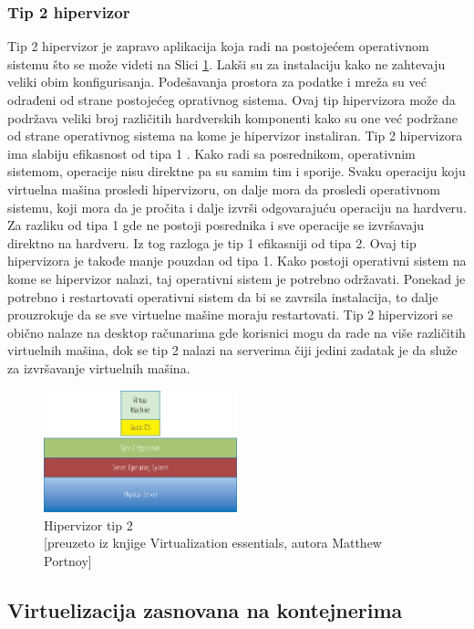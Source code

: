 \documentclass[12pt,oneside]{memoir}
\begin{document}
\subsubsection{Tip 2 hipervizor}
Tip 2 hipervizor je zapravo aplikacija koja radi na postojećem operativnom sistemu što se može videti na Slici \ref{fig:hipervizorTip2}. Lakši su za instalaciju kako ne zahtevaju veliki obim konfigurisanja. Podešavanja prostora za podatke i mreža su već odrađeni od strane postojećeg oprativnog sistema. Ovaj tip hipervizora može da podržava veliki broj različitih hardverskih komponenti kako su one već podržane od strane operativnog sistema na kome je hipervizor instaliran. Tip 2 hipervizora ima slabiju efikasnost od tipa 1 \cite{ve}. Kako radi sa posrednikom, operativnim sistemom, operacije nisu direktne pa su samim tim i sporije. Svaku operaciju koju virtuelna mašina prosledi hipervizoru, on dalje mora da prosledi operativnom sistemu, koji mora da je pročita i dalje izvrši odgovarajuću operaciju na hardveru. Za razliku od tipa 1 gde ne postoji posrednika i sve operacije se izvršavaju direktno na hardveru. Iz tog razloga je tip 1 efikasniji od tipa 2. 
Ovaj tip hipervizora je takođe manje pouzdan od tipa 1. Kako postoji operativni sistem na kome se hipervizor nalazi, taj operativni sistem je potrebno održavati. Ponekad je potrebno i restartovati operativni sistem da bi se zavrsila instalacija, to dalje prouzrokuje da se sve virtuelne mašine moraju restartovati. Tip 2 hipervizori se obično nalaze na desktop računarima gde korisnici mogu da rade na više različitih virtuelnih mašina, dok se tip 2 nalazi na serverima čiji jedini zadatak je da služe za izvršavanje virtuelnih mašina.

\begin{figure}[!ht]
  \centering
  \includegraphics[width=0.5\textwidth]{Slika 3.jpg}
  \caption{Hipervizor tip 2\\\footnotesize[preuzeto iz knjige Virtualization essentials, autora Matthew Portnoy]}
  \label{fig:hipervizorTip2}
\end{figure}

 
\subsection{Virtuelizacija zasnovana na kontejnerima}
\end{document}
